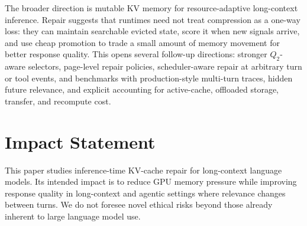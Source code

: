 \documentclass{article}
\begin{document}
{The broader direction is mutable KV memory for resource-adaptive long-context inference. Repair suggests that runtimes need not treat compression as a one-way loss: they can maintain searchable evicted state, score it when new signals arrive, and use cheap promotion to trade a small amount of memory movement for better response quality. This opens several follow-up directions: stronger $Q_2$-aware selectors, page-level repair policies, scheduler-aware repair at arbitrary turn or tool events, and benchmarks with production-style multi-turn traces, hidden future relevance, and explicit accounting for active-cache, offloaded storage, transfer, and recompute cost.

\section*{Impact Statement}
This paper studies inference-time KV-cache repair for long-context language models. Its intended impact is to reduce GPU memory pressure while improving response quality in long-context and agentic settings where relevance changes between turns. We do not foresee novel ethical risks beyond those already inherent to large language model use.}
\end{document}
